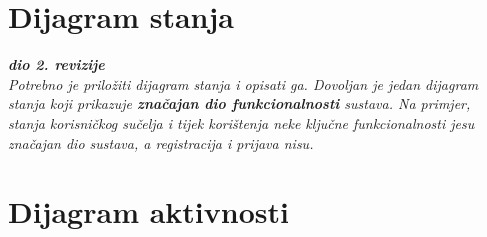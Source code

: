 			\eject
		
		\newpage
		\section{Dijagram stanja}
			
			\textbf{\textit{dio 2. revizije}}\\
			
			\textit{Potrebno je priložiti dijagram stanja i opisati ga. Dovoljan je jedan dijagram stanja koji prikazuje \textbf{značajan dio funkcionalnosti} sustava. Na primjer, stanja korisničkog sučelja i tijek korištenja neke ključne funkcionalnosti jesu značajan dio sustava, a registracija i prijava nisu. }
			
			
			\eject 
		
		\section{Dijagram aktivnosti}
			
			
